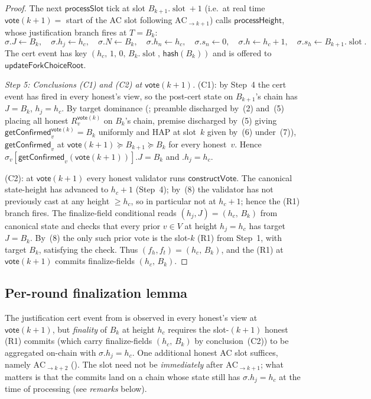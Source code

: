 \ifx\litemode\undefined\documentclass{article}\fi
\newcommand{\slot}[0]{\ensuremath{\operatorname{\mathrm{slot}}}}
\newcommand{\hash}{\mathsf{hash}}
\newcommand{\vote}{\mathsf{vote}}
\newcommand{\processSlot}{\textsf{processSlot}\xspace}
\newcommand{\processHeight}{\textsf{processHeight}\xspace}
\newcommand{\constructVote}{\textsf{constructVote}\xspace}
\newcommand{\updateForkChoiceRoot}{\textsf{updateForkChoiceRoot}\xspace}
\newcommand{\getConfirmed}{\textsf{getConfirmed}\xspace}
\theoremstyle{plain}
\theoremstyle{definition}
\theoremstyle{remark}
\begin{document}
\begin{proof}
The next $\processSlot$ tick at slot $B_{k+1}.\slot + 1$ (i.e.\ at real time $\vote(k+1) =$ start of the AC slot following $\mathrm{AC}_{\to k+1}$) calls $\processHeight$, whose justification branch fires at $T = B_k$:
\[
  \sigma.J \gets B_k,\quad \sigma.h_j \gets h_c,\quad \sigma.N \gets B_k,\quad \sigma.h_n \gets h_c,\quad \sigma.s_n \gets 0,\quad \sigma.h \gets h_c + 1,\quad \sigma.s_h \gets B_{k+1}.\slot.
\]
The cert event has key $(h_c,\, 1,\, 0,\, B_k.\slot,\, \hash(B_k))$ and is offered to $\updateForkChoiceRoot$.

\emph{Step 5: Conclusions \mbox{(C1)} and \mbox{(C2)} at $\vote(k+1)$.}
\mbox{(C1)}: by Step~4 the cert event has fired in every honest's view, so the post-cert state on $B_{k+1}$'s chain has $J = B_k$, $h_j = h_c$. By target dominance (; preamble discharged by~(2) and~(5) placing all honest $R_v^{\vote(k)}$ on $B_k$'s chain, premise discharged by~(5) giving $\getConfirmed_v^{\vote(k)} = B_k$ uniformly and HAP at slot~$k$ given by~(6) under~(7)), $\getConfirmed_v$ at $\vote(k+1) \succeq B_{k+1} \succeq B_k$ for every honest~$v$. Hence $\sigma_v[\getConfirmed_v(\vote(k+1))].J = B_k$ and $.h_j = h_c$.

\mbox{(C2)}: at $\vote(k+1)$ every honest validator runs $\constructVote$. The canonical state-height has advanced to $h_c + 1$ (Step~4); by~(8) the validator has not previously cast at any height $\geq h_c$, so in particular not at $h_c + 1$; hence the \mbox{(R1)} branch fires. The finalize-field conditional reads $(h_j, J) = (h_c,\, B_k)$ from canonical state and checks that every prior $v \in V$ at height $h_j = h_c$ has target $J = B_k$. By~(8) the only such prior vote is the slot-$k$ \mbox{(R1)} from Step~1, with target $B_k$, satisfying the check. Thus $(f_h, f_t) = (h_c,\, B_k)$, and the \mbox{(R1)} at $\vote(k+1)$ commits finalize-fields $(h_c,\, B_k)$.
\end{proof}

\subsection{Per-round finalization lemma}\label{rev:subsec:per-round-finality}

The justification cert event from  is observed in every honest's view at $\vote(k+1)$, but \emph{finality} of $B_k$ at height $h_c$ requires the slot-$(k+1)$ honest \mbox{(R1)} commits (which carry finalize-fields $(h_c,\, B_k)$ by conclusion~(C2)) to be aggregated on-chain with $\sigma.h_j = h_c$. One additional honest AC slot suffices, namely $\mathrm{AC}_{\to k+2}$ (). The slot need not be \emph{immediately} after $\mathrm{AC}_{\to k+1}$; what matters is that the commits land on a chain whose state still has $\sigma.h_j = h_c$ at the time of processing (see \emph{remarks} below).
\end{document}
